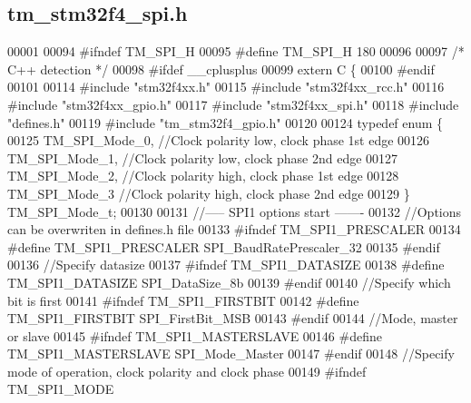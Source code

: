 \hypertarget{tm__stm32f4__spi_8h_source}{}\subsection{tm\+\_\+stm32f4\+\_\+spi.\+h}

\begin{DoxyCode}
00001 
00094 \textcolor{preprocessor}{#ifndef TM\_SPI\_H}
00095 \textcolor{preprocessor}{#define TM\_SPI\_H 180}
00096 
00097 \textcolor{comment}{/* C++ detection */}
00098 \textcolor{preprocessor}{#ifdef \_\_cplusplus}
00099 \textcolor{keyword}{extern} C \{
00100 \textcolor{preprocessor}{#endif}
00101 
00114 \textcolor{preprocessor}{#include "stm32f4xx.h"}
00115 \textcolor{preprocessor}{#include "stm32f4xx\_rcc.h"}
00116 \textcolor{preprocessor}{#include "stm32f4xx\_gpio.h"}
00117 \textcolor{preprocessor}{#include "stm32f4xx\_spi.h"}
00118 \textcolor{preprocessor}{#include "defines.h"}
00119 \textcolor{preprocessor}{#include "tm\_stm32f4\_gpio.h"}
00120 
00124 \textcolor{keyword}{typedef} \textcolor{keyword}{enum} \{
00125     TM\_SPI\_Mode\_0,  \textcolor{comment}{//Clock polarity low, clock phase 1st edge}
00126     TM\_SPI\_Mode\_1,  \textcolor{comment}{//Clock polarity low, clock phase 2nd edge}
00127     TM\_SPI\_Mode\_2,  \textcolor{comment}{//Clock polarity high, clock phase 1st edge}
00128     TM\_SPI\_Mode\_3   \textcolor{comment}{//Clock polarity high, clock phase 2nd edge}
00129 \} TM\_SPI\_Mode\_t;
00130 
00131 \textcolor{comment}{//----- SPI1 options start -------}
00132 \textcolor{comment}{//Options can be overwriten in defines.h file}
00133 \textcolor{preprocessor}{#ifndef TM\_SPI1\_PRESCALER}
00134 \textcolor{preprocessor}{#define TM\_SPI1\_PRESCALER   SPI\_BaudRatePrescaler\_32}
00135 \textcolor{preprocessor}{#endif}
00136 \textcolor{comment}{//Specify datasize}
00137 \textcolor{preprocessor}{#ifndef TM\_SPI1\_DATASIZE}
00138 \textcolor{preprocessor}{#define TM\_SPI1\_DATASIZE    SPI\_DataSize\_8b}
00139 \textcolor{preprocessor}{#endif}
00140 \textcolor{comment}{//Specify which bit is first}
00141 \textcolor{preprocessor}{#ifndef TM\_SPI1\_FIRSTBIT}
00142 \textcolor{preprocessor}{#define TM\_SPI1\_FIRSTBIT    SPI\_FirstBit\_MSB}
00143 \textcolor{preprocessor}{#endif}
00144 \textcolor{comment}{//Mode, master or slave}
00145 \textcolor{preprocessor}{#ifndef TM\_SPI1\_MASTERSLAVE}
00146 \textcolor{preprocessor}{#define TM\_SPI1\_MASTERSLAVE SPI\_Mode\_Master}
00147 \textcolor{preprocessor}{#endif}
00148 \textcolor{comment}{//Specify mode of operation, clock polarity and clock phase}
00149 \textcolor{preprocessor}{#ifndef TM\_SPI1\_MODE}

\end{DoxyCode}
